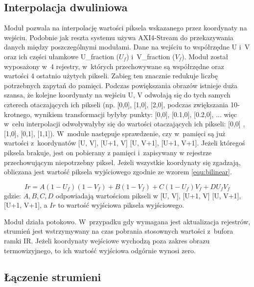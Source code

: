 \subsection{Interpolacja dwuliniowa} 
Moduł pozwala na interpolację wartości piksela wskazanego przez koordynaty na wejściu.
Podobnie jak reszta systemu używa AXI4-Stream do przekazywania danych między poszczególnymi modułami.
Dane na wejściu to współrzędne U i~V oraz ich części ułamkowe U\_fraction ($U_f$) i~V\_fraction ($V_f$).
Moduł został wyposażony w~4 rejestry, w~których przechowywane są współrzędne oraz wartości 4 ostatnio użytych pikseli.
Zabieg ten znacznie redukuje liczbę potrzebnych zapytań do pamięci.
Podczas powiększania obrazów istnieje duża szansa, że kolejne koordynaty na wejściu U, V odwołają się do tych samych czterech otaczających ich pikseli (np. [0,0], [1,0], [2,0], podczas zwiększania 10-krotnego, wynikiem transformacji byłyby punkty: [0,0], [0.1,0], [0.2,0], ... więc w~celu interpolacji odwoływałyby się do wartości otaczających ich pikseli: [0,0] , [1,0], [0,1], [1,1]).
W~module następuje sprawdzenie, czy w~pamięci są już wartości z~koordynatów [U, V], [U+1, V] [U, V+1], [U+1, V+1].
Jeżeli któregoś piksela brakuje, jest on pobierany z pamięci i~zapisywany w rejestrze przechowującym niepotrzebny piksel.
Jeżeli wszystkie koordynaty się zgadzają, obliczana jest wartość piksela wyjściowego zgodnie ze wzorem \eqref{equ:bilinear}.

\begin{equation}\label{equ:bilinear}
Ir = A(1-U_{f})(1-V_{f})+B(1-V_{f})+C(1- U_{f})V_{f}+ D U_{f} V_{f}
\end{equation}
\noindent gdzie: $ A, B, C,D $ odpowiadają wartościom pikseli w [U, V], [U+1, V] [U, V+1], [U+1, V+1], a $ Ir $ to wartość wyjściowa piksela wyjściowego.

Moduł działa potokowo. 
W~przypadku gdy wymagana jest  aktualizacja rejestrów, strumień jest wstrzymywany na czas pobrania stosownych wartości z~bufora ramki IR.
Jeżeli koordynaty wejściowe wychodzą poza zakres obrazu termowizyjnego, to ich wartość wyjściowa odgórnie wynosi zero.

\subsection{Łączenie strumieni}

